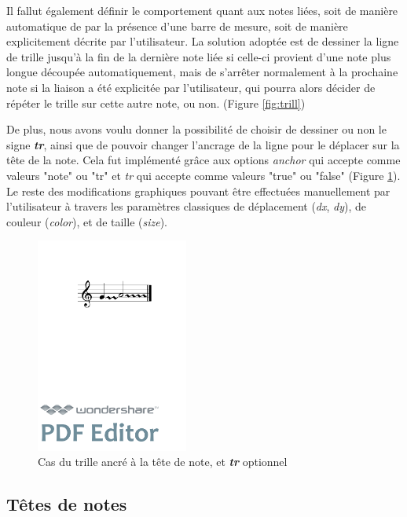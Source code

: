 \documentclass{article}
\newenvironment{code}
  {\fontfamily{pnc}\selectfont}{}
\begin{document}
Il fallut également définir le comportement quant aux notes liées, soit de manière automatique de par la présence d'une barre de mesure, soit de manière explicitement décrite par l'utilisateur. La solution adoptée est de dessiner la ligne de trille jusqu'à la fin de la dernière note liée si celle-ci provient d'une note plus longue découpée automatiquement, mais de s'arrêter normalement à la prochaine note si la liaison a été explicitée par l'utilisateur, qui pourra alors décider de répéter le trille sur cette autre note, ou non. (Figure \ref{fig:trill})

De plus, nous avons voulu donner la possibilité de choisir de dessiner ou non le signe \textit{\textbf{tr}}, ainsi que de pouvoir changer l'ancrage de la ligne pour le déplacer sur la tête de la note. Cela fut implémenté grâce aux options \textit{anchor} qui accepte comme valeurs "note" ou "tr" et \textit{tr} qui accepte comme valeurs "true" ou "false" (Figure \ref{fig:trillanchor}). Le reste des modifications graphiques pouvant être effectuées manuellement par l'utilisateur à travers les paramètres classiques de déplacement (\textit{dx}, \textit{dy}), de couleur (\textit{color}), et de taille (\textit{size}).

\begin{figure}[h]
\centering
\begin{code}
[ \textbackslash{}trill\textless{}tr="false", anchor="note"\textgreater{}( \{g\} \{a/2\} ) ]
\end{code}
\includegraphics[width=5cm]{img/trillanchor.pdf}
\caption{Cas du trille ancré à la tête de note, et \textit{\textbf{tr}} optionnel}
\label{fig:trillanchor}
\end{figure}

\subsection{Têtes de notes}\label{subsec:tetes_notes}
\end{document}
